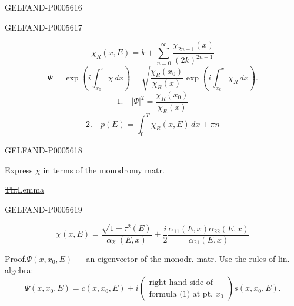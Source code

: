 \begin{GelfandAdjacentEvidence}{GELFAND-P000561}{6}

\end{GelfandAdjacentEvidence}
\begin{GelfandAdjacentEvidence}{GELFAND-P000561}{7}

\[
\chi_R(x,E)=k+\sum_{n=0}^{\infty}\frac{\chi_{2n+1}(x)}{(2k)^{2n+1}}
\]
\[
\Psi=\exp\left(i\int_{x_0}^{x}\chi\,dx\right)
=\sqrt{\frac{\chi_R(x_0)}{\chi_R(x)}}\exp\left(i\int_{x_0}^{x}\chi_R\,dx\right).
\]
\[
1.\quad|\Psi|^2=\frac{\chi_R(x_0)}{\chi_R(x)}
\]
\[
2.\quad p(E)=\int_0^T\chi_R(x,E)\,dx+\pi n
\]
\end{GelfandAdjacentEvidence}
\begin{GelfandAdjacentEvidence}{GELFAND-P000561}{8}

Express \(\chi\) in terms of the monodromy matr.

\sout{\underline{Th.}}\quad\underline{Lemma}
\end{GelfandAdjacentEvidence}
\begin{GelfandAdjacentEvidence}{GELFAND-P000561}{9}

\begin{equation*}
\chi(x,E)=\frac{\sqrt{1-\tau^2(E)}}{\alpha_{21}(E,x)}
+\frac i2\frac{\alpha_{11}(E,x)\alpha_{22}(E,x)}{\alpha_{21}(E,x)}
\tag{1}
\end{equation*}
\end{GelfandAdjacentEvidence}

\underline{Proof.}\quad \(\Psi(x,x_0,E)\) — an eigenvector of the monodr. matr. Use the rules of lin. algebra:
\[
\Psi(x,x_0,E)=c(x,x_0,E)+
i\left(\begin{gathered}\text{right-hand side of}\\\text{formula (1) at pt. }x_0\end{gathered}\right)s(x,x_0,E).
\]


